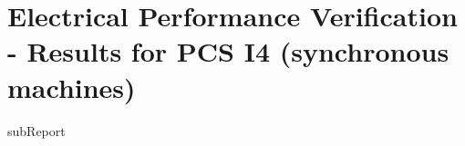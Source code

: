 \renewcommand{\DTRPcs}{I4SM} %
\renewcommand{\DTRPcsLong}{I4 (synchronous machines)}


    \section{Electrical Performance Verification - Results for PCS \DTRPcsLong}

    {{subReport}}
    \newpage

